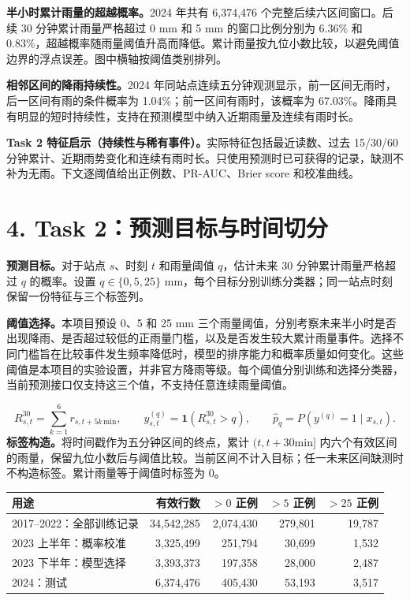 \documentclass[UTF8,fontset=fandol,10pt,a4paper,landscape]{ctexart}
\begin{document}
\textbf{半小时累计雨量的超越概率。}2024 年共有 6,374,476 个完整后续六区间窗口。后续 30 分钟累计雨量严格超过 0 mm 和 5 mm 的窗口比例分别为 6.36\% 和 0.83\%，超越概率随雨量阈值升高而降低。累计雨量按九位小数比较，以避免阈值边界的浮点误差。图中横轴按阈值类别排列。

\textbf{相邻区间的降雨持续性。}2024 年同站点连续五分钟观测显示，前一区间无雨时，后一区间有雨的条件概率为 1.04\%；前一区间有雨时，该概率为 67.03\%。降雨具有明显的短时持续性，支持在预测模型中纳入近期雨量及连续有雨时长。

\textbf{Task 2 特征启示（持续性与稀有事件）。}实际特征包括最近读数、过去 15/30/60 分钟累计、近期雨势变化和连续有雨时长。只使用预测时已可获得的记录，缺测不补为无雨。下文逐阈值给出正例数、PR-AUC、Brier score 和校准曲线。
\clearpage\section*{4. Task 2：预测目标与时间切分}
\textbf{预测目标。}对于站点 $s$、时刻 $t$ 和雨量阈值 $q$，估计未来 30 分钟累计雨量严格超过 $q$ 的概率。设置 $q\in\{0,5,25\}$ mm，每个目标分别训练分类器；同一站点时刻保留一份特征与三个标签列。

\textbf{阈值选择。}本项目预设 0、5 和 25 mm 三个雨量阈值，分别考察未来半小时是否出现降雨、是否超过较低的正雨量门槛，以及是否发生较大累计雨量事件。选择不同门槛旨在比较事件发生频率降低时，模型的排序能力和概率质量如何变化。这些阈值是本项目的实验设置，并非官方降雨等级。每个阈值分别训练和选择分类器，当前预测接口仅支持这三个值，不支持任意连续雨量阈值。

\[R_{s,t}^{30}=\sum_{k=1}^{6}r_{s,t+5k\,\mathrm{min}},\qquad y_{s,t}^{(q)}=\mathbf{1}(R_{s,t}^{30}>q),\qquad \hat p_q=P(y^{(q)}=1\mid x_{s,t}).\]
\textbf{标签构造。}将时间戳作为五分钟区间的终点，累计 $(t,t+30\mathrm{min}]$ 内六个有效区间的雨量，保留九位小数后与阈值比较。当前区间不计入目标；任一未来区间缺测时不构造标签。累计雨量等于阈值时标签为 0。

\begin{center}\begin{tabular}{lrrrr}\toprule
用途 & 有效行数 & $>0$ 正例 & $>5$ 正例 & $>25$ 正例\\\midrule
2017--2022：全部训练记录 & 34,542,285 & 2,074,430 & 279,801 & 19,787\\
2023 上半年：概率校准 & 3,325,499 & 251,794 & 30,699 & 1,532\\
2023 下半年：模型选择 & 3,393,373 & 197,358 & 28,000 & 2,487\\
2024：测试 & 6,374,476 & 405,430 & 53,193 & 3,517\\
\bottomrule\end{tabular}\end{center}
\end{document}
